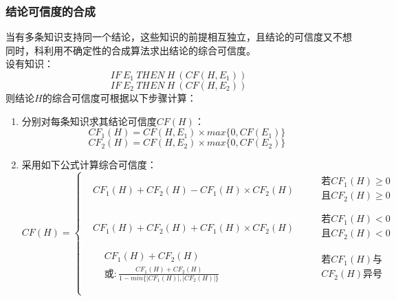\documentclass[12pt]{article}
\begin{document}
\subsubsection{结论可信度的合成}
当有多条知识支持同一个结论，这些知识的前提相互独立，且结论的可信度又不想同时，科利用不确定性的合成算法求出结论的综合可信度。\\
设有知识：
$$IF\ E_1\ THEN\ H\ (CF(H,E_1))$$
$$IF\ E_2\ THEN\ H\ (CF(H,E_2))$$
则结论$H$的综合可信度可根据以下步骤计算：
\begin{enumerate}
	\item{分别对每条知识求其结论可信度$CF(H)$：
			$$CF_1(H)=CF(H,E_1)\times max\{0,CF(E_1)\}$$
			$$CF_2(H)=CF(H,E_2)\times max\{0,CF(E_2)\}$$
		}
	\item{采用如下公式计算综合可信度：
			\[ CF(H)=\left\{
			\begin{aligned}
				&CF_1(H)+CF_2(H)-CF_1(H)\times{CF_2(H)}&&
				\begin{split}
					&若CF_1(H)\geq 0\\
					&且CF_2(H)\geq 0\\
				\end{split}\\
				&CF_1(H)+CF_2(H)+CF_1(H)\times{CF_2(H)}&&
				\begin{split}
					&若CF_1(H)<0\\
					&且CF_2(H)<0\\
				\end{split}\\
				&\begin{split}
					&CF_1(H)+CF_2(H)\\
					&或:\frac{CF_1(H)+CF_2(H)}{1-min\{|CF_1(H)|,|CF_2(H)|\}}\\
				\end{split} &&
				\begin{split}
					&若CF_1(H)与\\
					&CF_2(H)异号\\
				\end{split}\\
			\end{aligned}
		\right.\]
		}
\end{enumerate}
\end{document}
